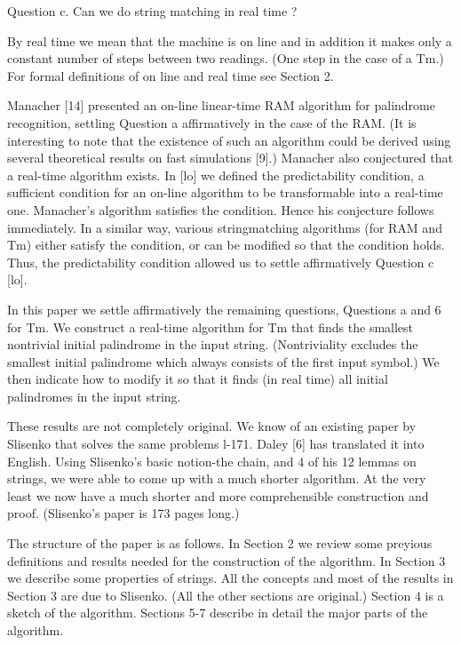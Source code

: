 \documentclass[11pt,a4paper]{report}
\begin{document}
Question c. Can we do string matching in real time ? 

By real time we mean that the machine is on line and in addition it makes only a
constant number of steps between two readings. (One step in the case of a Tm.) For
formal definitions of on line and real time see Section 2.

Manacher [14] presented an on-line linear-time RAM algorithm for palindrome
recognition, settling Question a affirmatively in the case of the RAM. (It is interesting
to note that the existence of such an algorithm could be derived using several theoretical
results on fast simulations [9].) Manacher also conjectured that a real-time algorithm
exists. In [lo] we defined the predictability condition, a sufficient condition for an on-line
algorithm to be transformable into a real-time one. Manacher’s algorithm satisfies the
condition. Hence his conjecture follows immediately. In a similar way, various stringmatching algorithms (for RAM and Tm) either satisfy the condition, or can be modified
so that the condition holds. Thus, the predictability condition allowed us to settle
affirmatively Question c [lo].

In this paper we settle affirmatively the remaining questions, Questions a and 6 for Tm.
We construct a real-time algorithm for Tm that finds the smallest nontrivial initial
palindrome in the input string. (Nontriviality excludes the smallest initial palindrome
which always consists of the first input symbol.) We then indicate how to modify it so
that it finds (in real time) all initial palindromes in the input string.

These results are not completely original. We know of an existing paper by Slisenko
that solves the same problems l-171. Daley [6] has translated it into English. Using
Slisenko’s basic notion-the chain, and 4 of his 12 lemmas on strings, we were able to
come up with a much shorter algorithm. At the very least we now have a much shorter
and more comprehensible construction and proof. (Slisenko’s paper is 173 pages long.)

The structure of the paper is as follows. In Section 2 we review some preyious definitions
and results needed for the construction of the algorithm. In Section 3 we describe some
properties of strings. All the concepts and most of the results in Section 3 are due to
Slisenko. (All the other sections are original.) Section 4 is a sketch of the algorithm.
Sections 5-7 describe in detail the major parts of the algorithm. 
\end{document}
